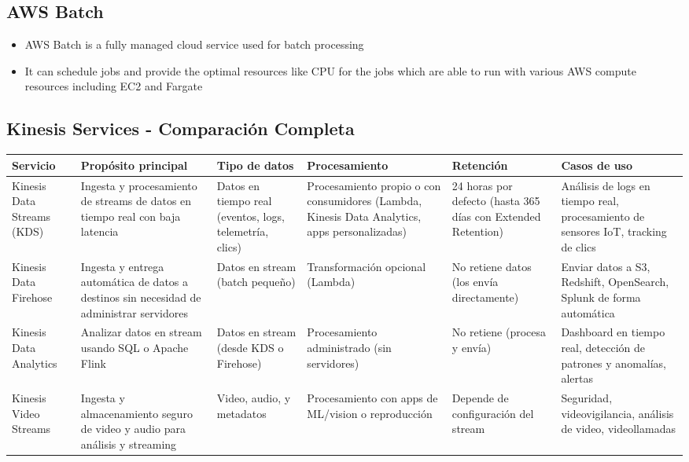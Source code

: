 \documentclass[12pt,a4paper]{report}
\begin{document}
\subsection{AWS Batch}

\begin{itemize}
    \item AWS Batch is a fully managed cloud service used for batch processing
    \item It can schedule jobs and provide the optimal resources like CPU for the jobs which are able to run with various AWS compute resources including EC2 and Fargate
\end{itemize}

\subsection{Kinesis Services - Comparación Completa}

\begin{center}
\begin{longtable}{|p{2.2cm}|p{2.8cm}|p{2.2cm}|p{2.8cm}|p{2.2cm}|p{2.8cm}|}
\hline
\cellcolor{awsblue!20}\textbf{Servicio} & \cellcolor{awsblue!20}\textbf{Propósito principal} & \cellcolor{awsblue!20}\textbf{Tipo de datos} & \cellcolor{awsblue!20}\textbf{Procesamiento} & \cellcolor{awsblue!20}\textbf{Retención} & \cellcolor{awsblue!20}\textbf{Casos de uso} \\
\hline
\cellcolor{successgreen!20}Kinesis Data Streams (KDS) & Ingesta y procesamiento de streams de datos en tiempo real con baja latencia & Datos en tiempo real (eventos, logs, telemetría, clics) & Procesamiento propio o con consumidores (Lambda, Kinesis Data Analytics, apps personalizadas) & 24 horas por defecto (hasta 365 días con Extended Retention) & Análisis de logs en tiempo real, procesamiento de sensores IoT, tracking de clics \\
\hline
Kinesis Data Firehose & Ingesta y entrega automática de datos a destinos sin necesidad de administrar servidores & Datos en stream (batch pequeño) & Transformación opcional (Lambda) & No retiene datos (los envía directamente) & Enviar datos a S3, Redshift, OpenSearch, Splunk de forma automática \\
\hline
Kinesis Data Analytics & Analizar datos en stream usando SQL o Apache Flink & Datos en stream (desde KDS o Firehose) & Procesamiento administrado (sin servidores) & No retiene (procesa y envía) & Dashboard en tiempo real, detección de patrones y anomalías, alertas \\
\hline
Kinesis Video Streams & Ingesta y almacenamiento seguro de video y audio para análisis y streaming & Video, audio, y metadatos & Procesamiento con apps de ML/vision o reproducción & Depende de configuración del stream & Seguridad, videovigilancia, análisis de video, videollamadas \\
\hline
\end{longtable}
\end{center}
\end{document}
